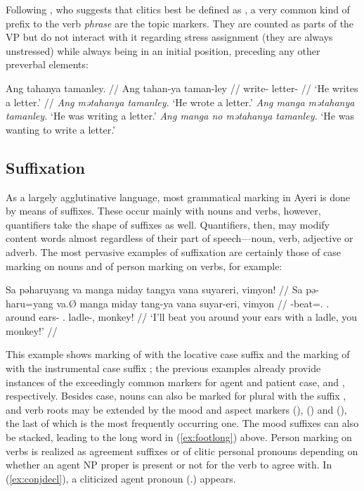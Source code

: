 Following \citet{klavans1985}, who suggests that clitics best be defined as
, a very common 
kind of prefix to the verb \emph{phrase} are the topic markers. They are
counted as parts of the VP but do not interact with it regarding stress
assignment (they are always unstressed) while always being in an initial
position, preceding any other preverbal elements:

\pex
	\a\begingl
		\gla Ang tahanya tamanley. //
		\glb Ang tahan-ya taman-ley //
		\glc \AgtT{} write-\TsgM{} letter-\PargI{} //
		\glft `He writes a letter.' //
	\endgl
	\a \textit{Ang mətahanya tamanley.} `He wrote a letter.'
	\a \textit{Ang manga mətahanya tamanley.} `He was writing a letter.'
	\a \textit{Ang manga no mətahanya tamanley.} `He was wanting to write a 
		letter.'
\xe



\subsection{Suffixation}

As a largely agglutinative language, most grammatical marking in Ayeri is done
by means of suffixes. These occur mainly with nouns and verbs, however,
quantifiers take the shape of suffixes as well. Quantifiers, then, may modify
content words almost regardless of their part of speech---noun, verb, adjective
or adverb. The most pervasive examples of suffixation are certainly those of
case marking on nouns and of person marking on verbs, for example:

\ex\label{ex:conjdecl}\begingl
	\gla Sa pəharuyang va manga miday tangya vana suyareri, vimyon! //
	\glb Sa pə-haru=yang va.Ø manga miday tang-ya vana suyar-eri, vimyon //
	\glc \PatT{} \NFut{}-beat=\Fsg{}.\Aarg{} \Ssg{}.\Top{} \Dyn{} around 
		ears-\Loc{} \Ssg{}.\Gen{} ladle-\Ins{}, monkey! //
	\glft `I'll beat you around your ears with a ladle, you monkey!' //
\endgl\xe

This example shows marking of  with the locative case
suffix  and the marking of  with the
instrumental case suffix ; the previous examples already
provide instances of the exceedingly common markers for agent and patient case,
 and , respectively. Besides case, nouns can
also be marked for plural with the suffix , and verb roots may
be extended by the mood and aspect markers  (\Irr{}),
 (\Hab{}) and  (\Neg{}), the last of which is 
the most frequently occurring one. The mood suffixes can also be stacked,
leading to the long word in (\ref{ex:footlong}) above. Person marking on verbs
is realized as agreement suffixes or of clitic personal pronouns depending on
whether an agent NP proper is present or not for the verb to agree with. In
(\ref{ex:conjdecl}), a cliticized agent pronoun 
(\TsgM{}.\Aarg{}) appears.

